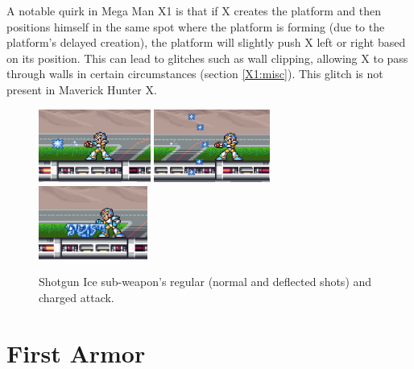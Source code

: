 A notable quirk in Mega Man X1 is that if X creates the platform and then positions himself in the same spot where the platform is forming (due to the platform's delayed creation), the platform will slightly push X left or right based on its position. This can lead to glitches such as wall clipping, allowing X to pass through walls in certain circumstances (section \ref{X1:misc}). This glitch is not present in Maverick Hunter X.

\begin{figure}[htp]
	\centering
		\includegraphics[height=2.4cm]{figures/X1/weapons/Shotgun_ice_1.jpg}
		\includegraphics[height=2.4cm]{figures/X1/weapons/Shotgun_ice_2.jpg}
		\includegraphics[height=2.4cm]{figures/X1/weapons/Shotgun_ice_3.jpg}
	\caption{Shotgun Ice sub-weapon's regular (normal and deflected shots) and charged attack.}
\end{figure}

\section{First Armor}\label{X1:Armor}

